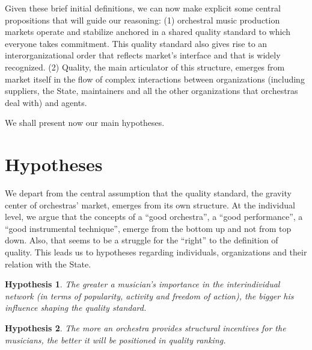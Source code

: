 \documentclass[a4paper, 12pt, openright, oneside, german, french, brazil, english]{abntex2}
\begin{document}
	Given these brief initial definitions, we can now make explicit some central propositions that will guide our reasoning: (1) orchestral music production markets operate and stabilize anchored in a shared quality standard to which everyone takes commitment. This quality standard also gives rise to an interorganizational order that reflects market's interface and that is widely recognized. (2) Quality, the main articulator of this structure, emerges from market itself in the flow of complex interactions between organizations (including suppliers, the State, maintainers and all the other organizations that orchestras deal with) and agents.
	
	
	We shall present now our main hypotheses.
	
	
	\section{Hypotheses}
	\newtheorem{hip}{Hypothesis}
	
	We depart from the central assumption that the quality standard, the gravity center of orchestras' market, emerges from its own structure. At the individual level, we argue that the concepts of a ``good orchestra'', a ``good performance'', a ``good instrumental technique'', emerge from the bottom up and not from top down. Also, that seems to be a struggle for the ``right'' to the definition of quality. This leads us to hypotheses regarding individuals, organizations and their relation with the State.
	
	\begin{hip}
		The greater a musician's importance in the interindividual network (in terms of popularity, activity and freedom of action), the bigger his influence shaping the quality standard.
	\end{hip}
	
	
	
	\begin{hip}
		The more an orchestra provides structural incentives for the musicians, the better it will be positioned in quality ranking.
	\end{hip}
	
\end{document}

